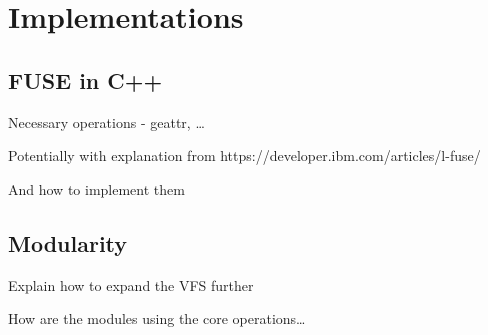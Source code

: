 \chapter{Implementations}

\section{FUSE in C++}\label{sec:fuse-in-c++}

Necessary operations - geattr, \ldots

Potentially with explanation from https://developer.ibm.com/articles/l-fuse/

And how to implement them

\section{Modularity}\label{sec:modularity}

Explain how to expand the VFS further

How are the modules using the core operations\ldots